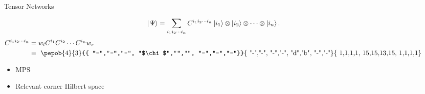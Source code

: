 \begin{frame}{Tensor Networks}

    \begin{equation}
        \ket{\Psi} = \sum_{i_1 i_2 \cdots i_n } C^{i_1 i_2 \cdots i_n} \ket{i_1} \otimes \ket{i_2} \otimes \cdots \otimes \ket{i_n}.
    \end{equation}
    \begin{equation}
        \begin{split}
            C^{i_1 i_2 \cdots i_n} &= w_l C^{i_1} C^{i_2} \cdots C^{i_n} w_r \\
            &=  \vcenter{ \hbox{ \pepob{4}{3}{{
                                "-","-","-",
                                "$\chi$","","",
                                "-","-","-"}}{{
                                "-","-",
                                "-","-",
                                "d","b",
                                "-","-"}}{{
                                1,1,1,1,
                                15,15,13,15,
                                1,1,1,1}} }}
        \end{split}
    \end{equation}

    \begin{itemize}
        \item MPS
        \item Relevant corner Hilbert space
    \end{itemize}
\end{frame}

